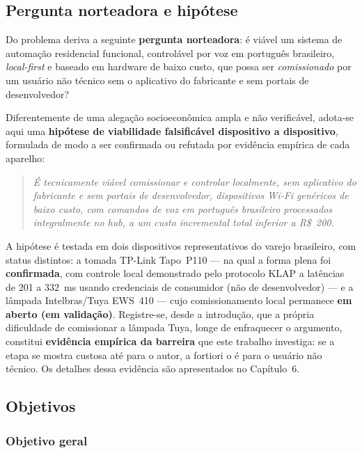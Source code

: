 \subsection{Pergunta norteadora e hipótese}

Do problema deriva a seguinte \textbf{pergunta norteadora}: é viável um sistema de
automação residencial funcional, controlável por voz em português brasileiro,
\textit{local-first} e baseado em hardware de baixo custo, que possa ser
\textit{comissionado} por um usuário não técnico sem o aplicativo do fabricante e sem
portais de desenvolvedor?

Diferentemente de uma alegação socioeconômica ampla e não verificável, adota-se aqui
uma \textbf{hipótese de viabilidade falsificável dispositivo a dispositivo}, formulada
de modo a ser confirmada ou refutada por evidência empírica de cada aparelho:

\begin{quote}
\textit{É tecnicamente viável comissionar e controlar localmente, sem aplicativo do
fabricante e sem portais de desenvolvedor, dispositivos Wi-Fi genéricos de baixo
custo, com comandos de voz em português brasileiro processados integralmente no
\textit{hub}, a um custo incremental total inferior a R\$~200.}
\end{quote}

A hipótese é testada em dois dispositivos representativos do varejo brasileiro, com
status distintos: a tomada TP-Link Tapo~P110 --- na qual a forma plena foi
\textbf{confirmada}, com controle local demonstrado pelo protocolo KLAP a latências de
201 a 332~ms usando credenciais de consumidor (não de desenvolvedor) --- e a lâmpada
Intelbras/Tuya EWS~410 --- cujo comissionamento local permanece \textbf{em aberto (em
validação)}. Registre-se, desde a introdução, que a própria dificuldade de comissionar
a lâmpada Tuya, longe de enfraquecer o argumento, constitui \textbf{evidência empírica
da barreira} que este trabalho investiga: se a etapa se mostra custosa até para o
autor, a fortiori o é para o usuário não técnico. Os detalhes dessa evidência são
apresentados no Capítulo~6.

\subsection{Objetivos}

\subsubsection{Objetivo geral}

